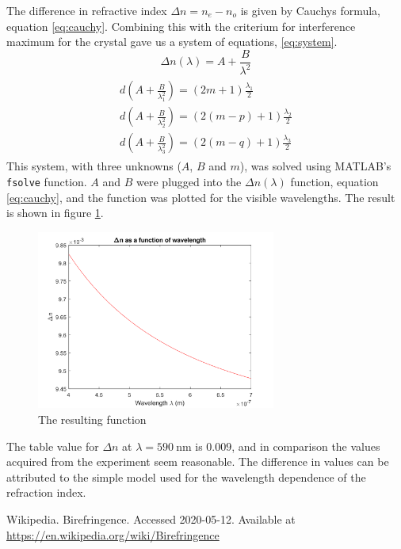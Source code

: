 \documentclass[a4paper]{article}
\begin{document}
The difference in refractive index $\Delta n = n_e - n_o$ is given by Cauchys formula, equation \ref{eq:cauchy}. Combining this with the criterium for interference maximum for the crystal gave us a system
of equations, \ref{eq:system}.
\begin{equation}
    \Delta n(\lambda) = A + \frac{B}{\lambda^2}
    \label{eq:cauchy}
\end{equation}
\begin{align}
\begin{split}
    d(A + \frac{B}{\lambda_1^2}) = (2m + 1)\frac{\lambda_1}{2} \\
    d(A + \frac{B}{\lambda_2^2}) = (2(m-p) + 1)\frac{\lambda_2}{2} \\
    d(A + \frac{B}{\lambda_3^2}) = (2(m-q) + 1)\frac{\lambda_3}{2}
    \label{eq:system}
\end{split}
\end{align}
This system, with three unknowns ($A$, $B$ and $m$), was solved using MATLAB's \texttt{fsolve} function. 
$A$ and $B$ were plugged into the $\Delta n(\lambda)$ function, equation \ref{eq:cauchy}, and the function was plotted for the
visible wavelengths. The result is shown in figure \ref{fig:result}.
\begin{figure}[h!]
    \centering
    \includegraphics[width=0.7\textwidth]{result.png}
    \caption{The resulting function}
    \label{fig:result}
\end{figure}
The table value for $\Delta n$ at $\lambda = \SI{590}{\nano\meter}$ is $0.009$\cite{wiki}, and in comparison the values acquired from the experiment seem reasonable.
The difference in values can be attributed to the simple model used for the wavelength dependence of the refraction index.

\begin{thebibliography}{1}
    Wikipedia. Birefringence. Accessed 2020-05-12. Available at \url{https://en.wikipedia.org/wiki/Birefringence}
\end{thebibliography}
\end{document}
